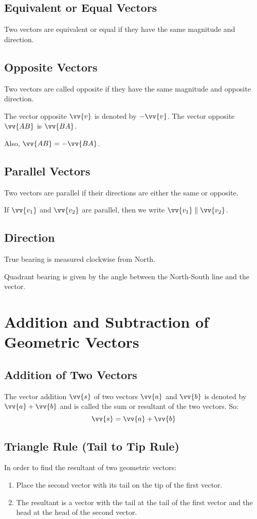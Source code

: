 		\subsection{Equivalent or Equal Vectors}
			Two vectors are equivalent or equal if they have the same magnitude and direction.
		\subsection{Opposite Vectors}
			Two vectors are called opposite if they have the same magnitude and opposite direction.

			The vector opposite $\vv{v}$ is denoted by $-\vv{v}$. The vector opposite $\vv{AB}$ is $\vv{BA}$.

			Also, $\vv{AB} = -\vv{BA}$.
		\subsection{Parallel Vectors}
			Two vectors are parallel if their directions are either the same or opposite.

			If $\vv{v_1}$ and $\vv{v_2}$ are parallel, then we write $\vv{v_1} \parallel \vv{v_2}$.
		\subsection{Direction}
			True bearing is measured clockwise from North.

			Quadrant bearing is given by the angle between the North-South line and the vector.
	\section{Addition and Subtraction of Geometric Vectors}
		\subsection{Addition of Two Vectors}
			The vector addition $\vv{s}$ of two vectors $\vv{a}$ and $\vv{b}$ is denoted by $\vv{a}+\vv{b}$ and is called the sum or resultant of the two vectors. So:
			\[\vv{s} = \vv{a} + \vv{b}\]
		\subsection{Triangle Rule (Tail to Tip Rule)}
			In order to find the resultant of two geometric vectors:
			\begin{enumerate}
				\item Place the second vector with its tail on the tip of the first vector.
				\item The resultant is a vector with the tail at the tail of the first vector and the head at the head of the second vector.
			\end{enumerate}
